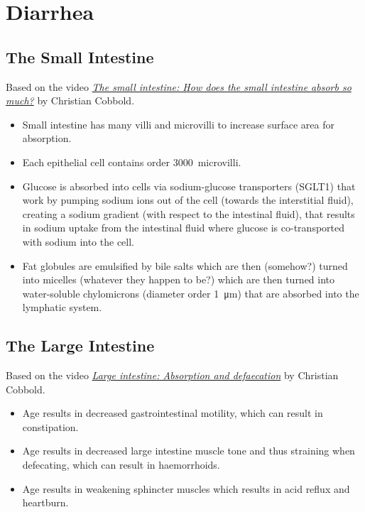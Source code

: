 \chapter{Diarrhea}
\label{ch:diarrhea}

\section{The Small Intestine}
Based on the video \textit{\href{https://www.youtube.com/watch?v=6BPMo8CbLCw&list=PLX2ZvPJ5dxu4}{The small intestine: How does the small intestine absorb so much?}} by Christian Cobbold.

\begin{itemize}
    \item Small intestine has many villi and microvilli to increase surface area for absorption.
    \item Each epithelial cell contains order \SI{3000} microvilli.
    \item Glucose is absorbed into cells via sodium-glucose transporters (SGLT1) that work by pumping sodium ions out of the cell (towards the interstitial fluid), creating a sodium gradient (with respect to the intestinal fluid), that results in sodium uptake from the intestinal fluid where glucose is co-transported with sodium into the cell.
    \item Fat globules are emulsified by bile salts which are then (somehow?) turned into micelles (whatever they happen to be?) which are then turned into water-soluble chylomicrons (diameter order \SI{1}{\micro \meter}) that are absorbed into the lymphatic system.
\end{itemize}

\section{The Large Intestine}
Based on the video \textit{\href{https://www.youtube.com/watch?v=aRas2Rv5Ssc&list=PLX2ZvPJ5dxu4}{Large intestine: Absorption and defaecation}} by Christian Cobbold.

\begin{itemize}
    \item Age results in decreased gastrointestinal motility, which can result in constipation.
    \item Age results in decreased large intestine muscle tone and thus straining when defecating, which can result in haemorrhoids.
    \item Age results in weakening sphincter muscles which results in acid reflux and heartburn.
\end{itemize}

